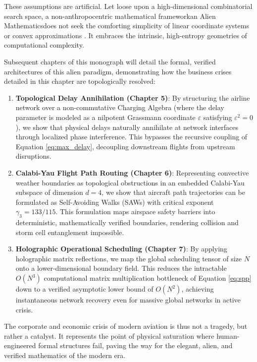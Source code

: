 \documentclass[11pt,a4paper]{book}
\begin{document}
These assumptions are artificial. Let loose upon a high-dimensional combinatorial search space, a non-anthropocentric mathematical frameworkan Alien Mathematicsdoes not seek the comforting simplicity of linear coordinate systems or convex approximations \cite{callens2024alien}. It embraces the intrinsic, high-entropy geometries of computational complexity. 

Subsequent chapters of this monograph will detail the formal, verified architectures of this alien paradigm, demonstrating how the business crises detailed in this chapter are topologically resolved:
\begin{enumerate}
    \item \textbf{Topological Delay Annihilation (Chapter 5)}: By structuring the airline network over a non-commutative Charging Algebra (where the delay parameter is modeled as a nilpotent Grassmann coordinate $\varepsilon$ satisfying $\varepsilon^2 = 0$), we show that physical delays naturally annihilate at network interfaces through localized phase interference. This bypasses the recursive coupling of Equation \ref{eq:max_delay}, decoupling downstream flights from upstream disruptions.
    \item \textbf{Calabi-Yau Flight Path Routing (Chapter 6)}: Representing convective weather boundaries as topological obstructions in an embedded Calabi-Yau subspace of dimension $d = 4$, we show that aircraft path trajectories can be formulated as Self-Avoiding Walks (SAWs) with critical exponent $\gamma_3 = 133/115$. This formulation maps airspace safety barriers into deterministic, mathematically verified boundaries, rendering collision and storm cell entanglement impossible.
    \item \textbf{Holographic Operational Scheduling (Chapter 7)}: By applying holographic matrix reflections, we map the global scheduling tensor of size $N$ onto a lower-dimensional boundary field. This reduces the intractable $O(N^3)$ computational matrix multiplication bottleneck of Equation \ref{eq:spp} down to a verified asymptotic lower bound of $O(N^2)$, achieving instantaneous network recovery even for massive global networks in active crisis.
\end{enumerate}

The corporate and economic crisis of modern aviation is thus not a tragedy, but rather a catalyst. It represents the point of physical saturation where human-engineered formal structures fail, paving the way for the elegant, alien, and verified mathematics of the modern era.
\end{document}
